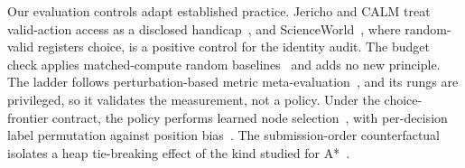 Our evaluation controls adapt established practice. Jericho and CALM treat valid-action access as a disclosed handicap~\citep{hausknecht2020interactive,yao2020keep}, and ScienceWorld~\citep{wang2022scienceworld}, where random-valid registers choice, is a positive control for the identity audit. The budget check applies matched-compute random baselines~\citep{li2019random,yang2020nasevaluation} and adds no new principle. The ladder follows perturbation-based metric meta-evaluation~\citep{sai2021perturbation}, and its rungs are privileged, so it validates the measurement, not a policy. Under the choice-frontier contract, the policy performs learned node selection~\citep{orseau2021policyguided}, with per-decision label permutation against position bias~\citep{loginova2025addressing,zheng2024robust}. The submission-order counterfactual isolates a heap tie-breaking effect of the kind studied for A*~\citep{asai2016tiebreaking}.
